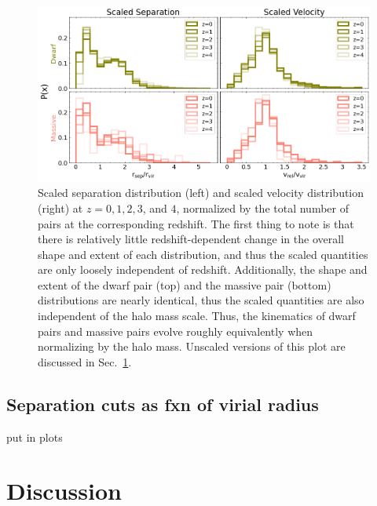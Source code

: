 \documentclass[twocolumn]{aastex631}
\begin{document}
    \begin{figure}[htp]
      \centering
      \includegraphics[width=\textwidth]{scaledcombodist_1000.png}
      \caption{
          Scaled separation distribution (left) and scaled velocity distribution (right) at $z=0,1,2,3$, and $4$, normalized by the total number of pairs at the corresponding redshift. 
          The first thing to note is that there is relatively little redshift-dependent change in the overall shape and extent of each distribution, and thus the scaled quantities are only loosely independent of redshift. 
          Additionally, the shape and extent of the dwarf pair (top) and the massive pair (bottom) distributions are nearly identical, thus the scaled quantities are also independent of the halo mass scale. Thus, the kinematics of dwarf pairs and massive pairs evolve roughly equivalently when normalizing by the halo mass.
          Unscaled versions of this plot are discussed in Sec.~\ref{sec:discussion}.
      }
      \label{fig:scaled-dist}
    \end{figure} 
    

\subsection{Separation cuts as fxn of virial radius}
put in plots~ 


\section{Discussion}\label{sec:discussion}
\end{document}
